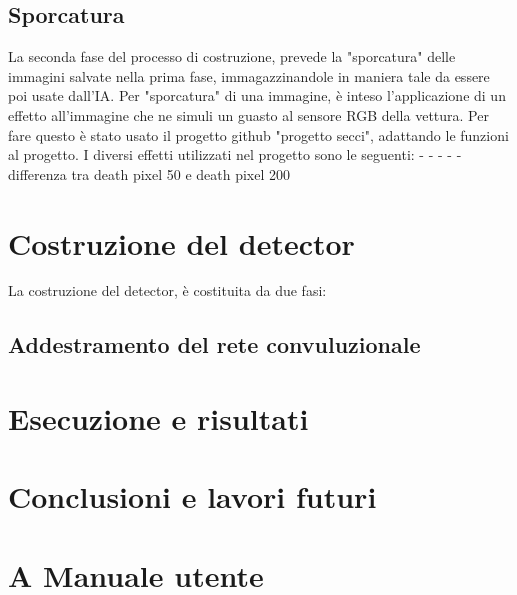 \documentclass[14pt]{extarticle}
\begin{document}
\subsection{Sporcatura}
La seconda fase del processo di costruzione, prevede la "sporcatura" delle immagini salvate nella prima fase, immagazzinandole in maniera tale da essere poi usate dall'IA.
Per "sporcatura" di una immagine, è inteso l'applicazione di un effetto all'immagine che ne simuli un guasto al sensore RGB della vettura.
Per fare questo è stato usato il progetto github "progetto secci", adattando le funzioni al progetto.
I diversi effetti utilizzati nel progetto sono le seguenti:
-
-
-
-
-
differenza tra death pixel 50 e death pixel 200 

\section{Costruzione del detector}
La costruzione del detector, è costituita da due fasi:
\subsection{Addestramento del rete convuluzionale}




\section{Esecuzione e risultati}

\section{Conclusioni e lavori futuri}

\section{A Manuale utente}
\end{document}
